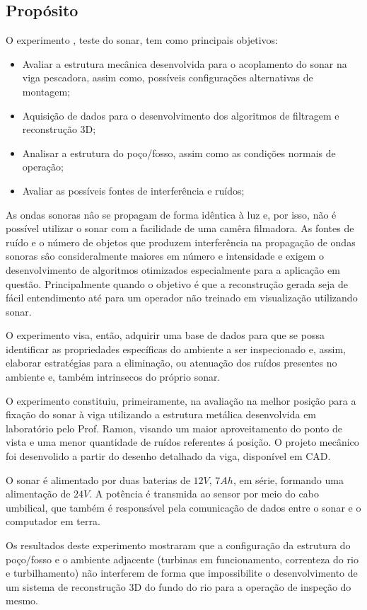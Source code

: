 

\subsection{Propósito}
\label{proposito_sonar}
O experimento %
, teste do sonar, tem como principais objetivos:
 \begin{itemize}
 \item Avaliar a estrutura mecânica desenvolvida para o acoplamento do sonar na
 viga pescadora, assim como, possíveis configurações alternativas de montagem;
 \item Aquisição de dados para o desenvolvimento dos algoritmos de filtragem e
 reconstrução 3D;
 \item Analisar a estrutura do poço/fosso, %
  assim como as condições normais de operação;
 \item Avaliar as possíveis fontes de interferência e ruídos;
 \end{itemize}

As ondas sonoras nâo se propagam de forma idêntica à luz e, por isso, não é
possível utilizar o sonar com a facilidade de uma camêra filmadora. As fontes de
ruído e o número de objetos que produzem interferência na propagação de ondas
sonoras sâo consideralmente maiores em número e intensidade e exigem o
desenvolvimento de algoritmos otimizados especialmente para a aplicação em
questão. Principalmente quando o objetivo é que a reconstrução gerada seja de
fácil entendimento até para um operador não treinado em visualização
utilizando sonar.

O experimento visa, então, adquirir uma base de dados para que se possa
identificar as propriedades específicas do ambiente a ser inspecionado e, assim, 
elaborar estratégias para a eliminação, ou atenuação dos ruídos presentes no
ambiente e, também intrinsecos do próprio sonar.

O experimento constituiu, primeiramente, na avaliação na melhor posição
para a fixação do sonar à viga utilizando a estrutura metálica desenvolvida em
laboratório pelo Prof. Ramon, visando um maior aproveitamento do ponto de vista
e uma menor quantidade de ruídos referentes á posição. O projeto mecânico foi
desenvolido a partir do desenho detalhado da viga, disponível em CAD.

O sonar é alimentado por duas baterias de $12V$, $7Ah$, em série, formando uma
alimentação de $24V$. A potência é transmida ao sensor por meio do cabo
umbilical, que também é responsável pela comunicação de dados entre o sonar e o
computador em terra.

Os resultados deste experimento mostraram que a configuração da estrutura do
poço/fosso e o ambiente adjacente (turbinas em funcionamento, correnteza do rio
e turbilhamento) não interferem de forma que impossibilite o desenvolvimento de
um sistema de reconstrução 3D do fundo do rio para a operação de inspeção do
mesmo.

